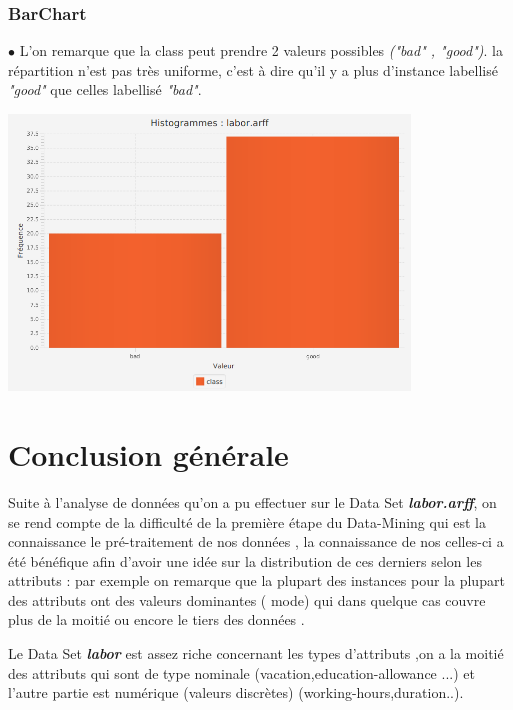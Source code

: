 \documentclass[12pt,a4paper,oneside]{book}
\begin{document}
	\subsubsection{BarChart}
	$\bullet $ L'on remarque que la class peut prendre 2 valeurs possibles \textit{("bad" , "good")}.  la répartition n'est pas très uniforme, c'est à dire qu'il y a plus d'instance labellisé \textit{"good"} que celles labellisé \textit{"bad"}.\\
	
	\begin{center}
		\includegraphics[width=0.8\textwidth]{screens/barchart/class-barchart.png}%
		\label{labelname}%
	\end{center}
	
	
	\newpage
	
	\section{Conclusion générale}
	
	Suite à l'analyse de données qu'on a pu effectuer sur le Data Set \textbf{\textit{labor.arff}}, on se rend compte de la difficulté de la première étape du Data-Mining qui est la connaissance  le pré-traitement de nos données , la connaissance de nos celles-ci a été bénéfique afin d'avoir une idée sur la distribution de ces derniers selon les attributs : par exemple on remarque que la plupart des instances pour la plupart des attributs ont des valeurs dominantes ( mode) qui dans quelque cas couvre plus de la moitié ou encore le tiers des données .
	
	Le Data Set \textbf{\textit{labor}} est assez riche concernant les types d'attributs ,on a la moitié des attributs qui sont de type nominale (vacation,education-allowance ...) et
	l'autre partie est numérique (valeurs discrètes) (working-hours,duration..).
	
\end{document}
